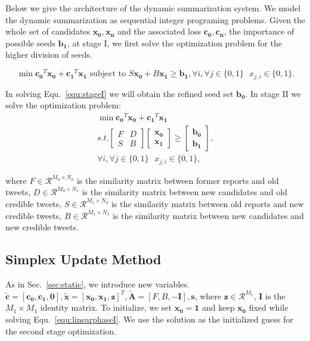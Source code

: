 \documentclass{llncs}
\begin{document}
Below we give the architecture of the dynamic summarization system. We model the dynamic summarization as sequential integer programing problems.  Given the whole set of candidates $\mathbf{x_0,x_n}$ and the associated loss $\mathbf{c_0,c_n}$, the importance of possible seeds $\mathbf{b_1}$, at stage I, we first solve the optimization problem for the higher division of seeds. 

\begin{equation}\label{equ:stageI}
\min \mathbf{c_0}^T \mathbf{x_0} + \mathbf{c_1}^T \mathbf{x_1} \textrm{ subject to } S \mathbf{x_0} + B\mathbf{x_1} \geq \mathbf{b_1}, \forall i, \forall j\in \{0,1\}\textrm{ } x_{j,i}\in \{0,1\}.
\end{equation}

In solving Equ.~\ref{equ:stageI} we will obtain the refined seed set $\mathbf{b_0}$. In stage II we solve the optimization problem:
\begin{eqnarray}
\min \mathbf{c_0}^T \mathbf{x_0}+\mathbf{c_1}^T\mathbf{x_1}\\\nonumber
s.t. \begin{bmatrix}
F & D \\
S & B
\end{bmatrix}\begin{bmatrix}
 \mathbf{x_0}\\
\mathbf{x_1}
\end{bmatrix}\geq \begin{bmatrix}
\mathbf{b_0}\\
\mathbf{b_1}
\end{bmatrix},\\\nonumber
 \forall i, \forall j\in \{0,1\}\textrm{ } x_{j,i}\in \{0,1\}, 
\end{eqnarray}

where $F\in \mathcal{R}^{M_0\times N_0}$ is the similarity matrix between former reports and old tweets, $D\in \mathcal{R}^{M_0\times N_1}$ is the similarity matrix between new candidates and old credible tweets, $S\in \mathcal{R}^{M_1\times N_0}$ is the similarity matrix between old reports and new credible tweets, $B\in \mathcal{R}^{M_1 \times N_1}$ is the similarity matrix between new candidates and new credible tweets.

\subsection{Simplex Update Method}

As in Sec.~\ref{sec:static}, we introduce new variables.  $\tilde{\mathbf{c}}=[\mathbf{c_0},\mathbf{c_1}, \mathbf{0}],\tilde{\mathbf{x}}=[\mathbf{x_0},\mathbf{x_1},\mathbf{z}]^T,\tilde{\mathbf{A}}=[F,B,-\mathbf{I}],\mathbf{s}$, where $\mathbf{z}\in\mathcal{R}^{M_1}$, $ \mathbf{I}$ is the $M_1\times M_1$ identity matrix. To initialize, we set  $\mathbf{x_0}=\mathbf{1}$ and keep $\mathbf{x_0}$ fixed while solving Equ.~\ref{equ:linearphaseI}. We use the solution as the initialized guess for the second stage optimization. 
\end{document}
